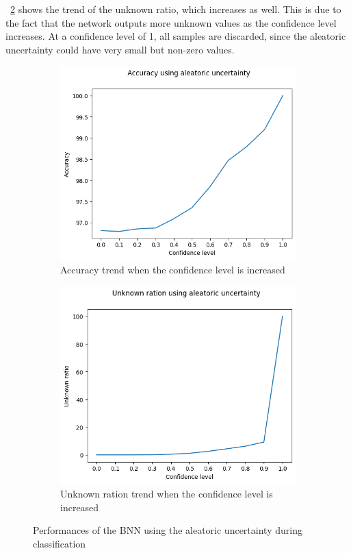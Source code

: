\Fig~\ref{fig:aleatoric_unk} shows the trend of the unknown ratio, which increases as well. This is due to the fact that the network outputs more unknown values as the confidence level increases. At a confidence level of 1, all samples are discarded, since the aleatoric uncertainty could have very small but non-zero values.

\begin{figure}[h]
	\centering
	\begin{subfigure}{.5\textwidth}
		\centering
		\includegraphics[width=0.8\linewidth]{ImageFiles/ClassifUncer/aleatoric_acc}
		\caption{Accuracy trend when the confidence level is increased}
		\label{fig:aleatoric_acc}
	\end{subfigure}%
	\begin{subfigure}{.5\textwidth}
		\centering
		\includegraphics[width=0.8\linewidth]{ImageFiles/ClassifUncer/aleatoric_unk}
		\caption{Unknown ration trend when the confidence level is increased}
		\label{fig:aleatoric_unk}
	\end{subfigure}
	\caption{Performances of the BNN using the aleatoric uncertainty during classification}
	\label{fig:aleatoric_class}
\end{figure}

